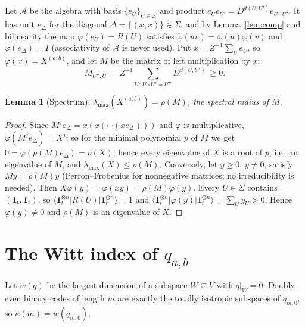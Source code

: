 \documentclass[11pt]{article}
\newcommand{\ket}[1]{\lvert #1\rangle}
\newcommand{\bra}[1]{\langle #1\rvert}
\newcommand{\one}{\mathbf 1}
\newtheorem{lemma}[theorem]{Lemma}
\theoremstyle{definition}
\theoremstyle{remark}
\begin{document}
Let $\mathcal A$ be the algebra with basis $\{e_U\}_{U\in\Sigma}$ and product $e_Ue_{U'}=D^{d(U,U')}e_{U\circ U'}$.
It has unit $e_\Delta$ for the diagonal $\Delta=\{(x,x)\}\in\Sigma$, and by Lemma~\ref{lem:comp} and
bilinearity the map $\varphi(e_U)=R(U)$ satisfies $\varphi(uv)=\varphi(u)\varphi(v)$ and $\varphi(e_\Delta)=I$
(associativity of $\mathcal A$ is never used). Put $x=Z^{-1}\sum_Ue_U$, so $\varphi(x)=X^{(a,b)}$, and let $M$ be
the matrix of left multiplication by $x$:
\[
M_{U'',U'}=Z^{-1}\sum_{U:\ U\circ U'=U''}D^{d(U,U')}\ \ge0 .
\]

\begin{lemma}[Spectrum]\label{lem:spec}
$\lambda_{\max}(X^{(a,b)})=\rho(M)$, the spectral radius of $M$.
\end{lemma}
\begin{proof}
Since $M^je_\Delta=x(x(\cdots(xe_\Delta)))$ and $\varphi$ is multiplicative, $\varphi(M^je_\Delta)=X^j$; so for the
minimal polynomial $p$ of $M$ we get $0=\varphi(p(M)e_\Delta)=p(X)$; hence every eigenvalue of $X$ is a root of
$p$, i.e.\ an eigenvalue of $M$, and $\lambda_{\max}(X)\le\rho(M)$. Conversely, let $y\ge0$, $y\ne0$, satisfy $My=\rho(M)y$
(Perron--Frobenius for nonnegative matrices; no irreducibility is needed). Then $X\varphi(y)=\varphi(xy)=\rho(M)
\varphi(y)$. Every $U\in\Sigma$ contains $(\one_t,\one_t)$, so $\bra{\one_t^{\otimes n}}R(U)\ket{\one_t^{\otimes n}}=1$
and $\bra{\one_t^{\otimes n}}\varphi(y)\ket{\one_t^{\otimes n}}=\sum_Uy_U>0$. Hence $\varphi(y)\ne0$ and $\rho(M)$ is
an eigenvalue of $X$.
\end{proof}

\section{The Witt index of \texorpdfstring{$q_{a,b}$}{q(a,b)}}\label{sec:witt}
Let $w(q)$ be the largest dimension of a subspace $W\subseteq V$ with $q|_W=0$. Doubly-even binary codes of length $m$
are exactly the totally isotropic subspaces of $q_{m,0}$, so $\kappa(m)=w(q_{m,0})$.
\end{document}
